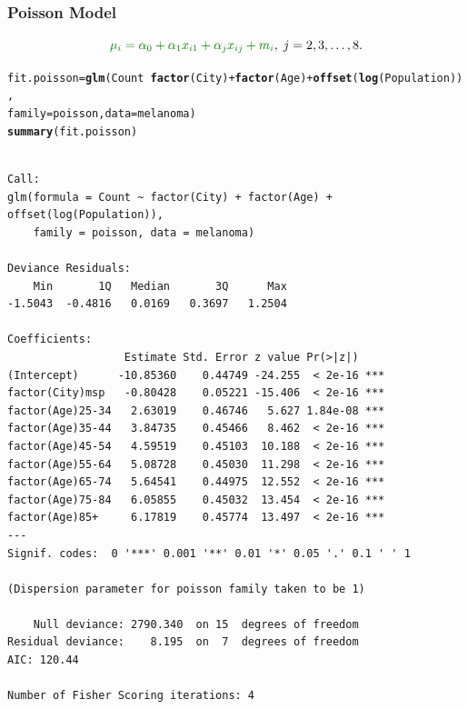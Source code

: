 \documentclass[oneside]{book}\usepackage[]{graphicx}\usepackage[svgnames]{xcolor}
\makeatletter
\newcommand{\hlopt}[1]{\textcolor[rgb]{0,0,0}{#1}}%
\newcommand{\hlstd}[1]{\textcolor[rgb]{0.345,0.345,0.345}{#1}}%
\newcommand{\hlkwb}[1]{\textcolor[rgb]{0.69,0.353,0.396}{#1}}%
\newcommand{\hlkwc}[1]{\textcolor[rgb]{0.333,0.667,0.333}{#1}}%
\newcommand{\hlkwd}[1]{\textcolor[rgb]{0.737,0.353,0.396}{\textbf{#1}}}%
\newenvironment{kframe}{%
 \def\at@end@of@kframe{}%
 \ifinner\ifhmode%
  \def\at@end@of@kframe{\end{minipage}}%
  \begin{minipage}{\columnwidth}%
 \fi\fi%
 \def\FrameCommand##1{\hskip\@totalleftmargin \hskip-\fboxsep
 \colorbox{shadecolor}{##1}\hskip-\fboxsep
     \hskip-\linewidth \hskip-\@totalleftmargin \hskip\columnwidth}%
 \MakeFramed {\advance\hsize-\width
   \@totalleftmargin\z@ \linewidth\hsize
   \@setminipage}}%
 {\par\unskip\endMakeFramed%
 \at@end@of@kframe}
\newenvironment{knitrout}{}{} %
\let\log\relax%
\makeatother
\begin{document}
\subsubsection*{Poisson Model}
\[ \textcolor{Green}{\log{\mu_i}=\alpha_0+\alpha_1x_{i1}+\alpha_jx_{ij}+\log{m_i}},\; j=2,3,\ldots,8. \]
\begin{knitrout}
\color{fgcolor}\begin{kframe}
\begin{alltt}
\hlstd{fit.poisson} \hlkwb{=} \hlkwd{glm}\hlstd{(Count} \hlopt{~} \hlkwd{factor}\hlstd{(City)} \hlopt{+} \hlkwd{factor}\hlstd{(Age)} \hlopt{+} \hlkwd{offset}\hlstd{(}\hlkwd{log}\hlstd{(Population)),}
  \hlkwc{family} \hlstd{= poisson,} \hlkwc{data} \hlstd{= melanoma)}
\hlkwd{summary}\hlstd{(fit.poisson)}
\end{alltt}
\begin{verbatim}

Call:
glm(formula = Count ~ factor(City) + factor(Age) + offset(log(Population)), 
    family = poisson, data = melanoma)

Deviance Residuals: 
    Min       1Q   Median       3Q      Max  
-1.5043  -0.4816   0.0169   0.3697   1.2504  

Coefficients:
                  Estimate Std. Error z value Pr(>|z|)    
(Intercept)      -10.85360    0.44749 -24.255  < 2e-16 ***
factor(City)msp   -0.80428    0.05221 -15.406  < 2e-16 ***
factor(Age)25-34   2.63019    0.46746   5.627 1.84e-08 ***
factor(Age)35-44   3.84735    0.45466   8.462  < 2e-16 ***
factor(Age)45-54   4.59519    0.45103  10.188  < 2e-16 ***
factor(Age)55-64   5.08728    0.45030  11.298  < 2e-16 ***
factor(Age)65-74   5.64541    0.44975  12.552  < 2e-16 ***
factor(Age)75-84   6.05855    0.45032  13.454  < 2e-16 ***
factor(Age)85+     6.17819    0.45774  13.497  < 2e-16 ***
---
Signif. codes:  0 '***' 0.001 '**' 0.01 '*' 0.05 '.' 0.1 ' ' 1

(Dispersion parameter for poisson family taken to be 1)

    Null deviance: 2790.340  on 15  degrees of freedom
Residual deviance:    8.195  on  7  degrees of freedom
AIC: 120.44

Number of Fisher Scoring iterations: 4
\end{verbatim}
\end{kframe}
\end{knitrout}
\end{document}
